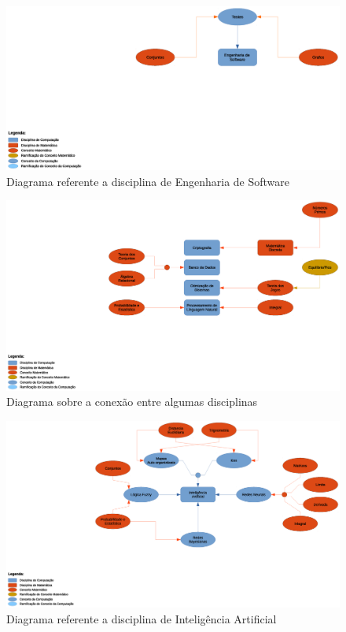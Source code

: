 \documentclass[12pt,a4paper]{article}
\begin{document}
\begin{figure}[htb]
	\centering
	\includegraphics[scale=0.35]{imagens/ES.eps} 
	\flushleft	
	\caption{Diagrama referente a disciplina de Engenharia de Software}
	\label{fig:diagramaES}
\end{figure}

\begin{figure}[htb]
	\centering
	\includegraphics[scale=0.35]{imagens/Outros.eps} 
	\flushleft
	\caption{Diagrama sobre a conexão entre algumas disciplinas}
	\label{fig:diagramaOutros}
\end{figure}

\begin{figure}[htb]
	\centering
	\includegraphics[scale=0.35]{imagens/IA.eps}
	\flushleft
	\caption{Diagrama referente a disciplina de Inteligência Artificial}
	\label{fig:diagramaIA}	
\end{figure}
\end{document}
